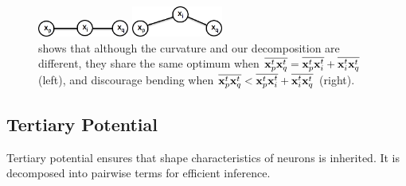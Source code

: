 \documentclass{article}
\begin{document}
\begin{figure}[b!]
	\vspace{-10pt}
	\centering
	\begin{minipage}[b]{0.49\linewidth}
		\centerline{\includegraphics[width=3cm]{img/tri1.png}}
	\end{minipage}
	\begin{minipage}[b]{0.49\linewidth}
		\centerline{\includegraphics[width=3cm]{img/tri2.png}}
	\end{minipage}
	\vspace{-10pt}
	\caption{\small{shows that although the curvature and our decomposition are different, they share the same optimum when $\overline{{\bf x}_p^t {\bf x}_q^t} = \overline{{\bf x}_p^t {\bf x}_i^t} + \overline{{\bf x}_i^t {\bf x}_q^t}$ (left), and discourage bending when $\overline{{\bf x}_p^t {\bf x}_q^t} < \overline{{\bf x}_p^t {\bf x}_i^t} + \overline{{\bf x}_i^t {\bf x}_q^t}$ (right).}}
	\label{fig:triangle}
	\vspace{-10pt}
\end{figure}

\subsection{Tertiary Potential} \label{sec:tertiary_pot}
Tertiary potential ensures that shape characteristics of neurons is inherited. It is decomposed into pairwise terms for efficient inference.
\end{document}
